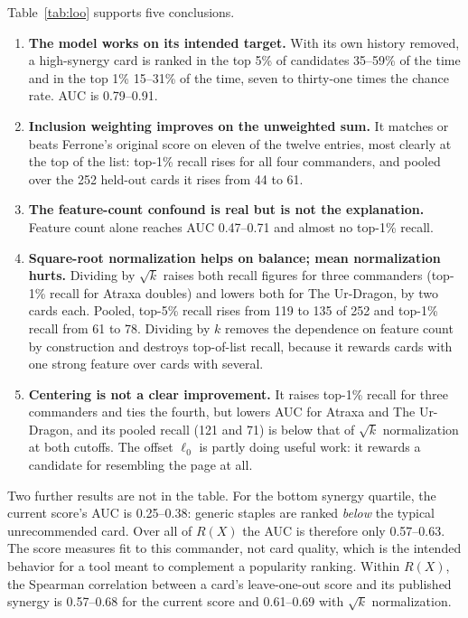 \documentclass[11pt]{article}
\theoremstyle{remark}
\begin{document}
\noindent Table~\ref{tab:loo} supports five conclusions.
\begin{enumerate}
  \item \textbf{The model works on its intended target.} With its own history
        removed, a high-synergy card is ranked in the top 5\% of candidates
        35--59\% of the time and in the top 1\% 15--31\% of the time, seven to
        thirty-one times the chance rate. AUC is 0.79--0.91.
  \item \textbf{Inclusion weighting improves on the unweighted sum.} It matches
        or beats Ferrone's original score on eleven of the twelve entries, most
        clearly at the top of the list: top-1\% recall rises for all four
        commanders, and pooled over the 252 held-out cards it rises from 44 to 61.
  \item \textbf{The feature-count confound is real but is not the explanation.}
        Feature count alone reaches AUC 0.47--0.71 and almost no top-1\% recall.
  \item \textbf{Square-root normalization helps on balance; mean normalization
        hurts.} Dividing by $\sqrt{k}$ raises both recall figures for three
        commanders (top-1\% recall for Atraxa doubles) and lowers both for The
        Ur-Dragon, by two cards each. Pooled, top-5\% recall rises from 119 to
        135 of 252 and top-1\% recall from 61 to 78. Dividing by $k$ removes the
        dependence on feature count by construction and destroys top-of-list
        recall, because it rewards cards with one strong feature over cards with
        several.
  \item \textbf{Centering is not a clear improvement.} It raises top-1\% recall
        for three commanders and ties the fourth, but lowers AUC for Atraxa and
        The Ur-Dragon, and its pooled recall (121 and 71) is below that of
        $\sqrt{k}$ normalization at both cutoffs. The offset $\ell_0$ is partly
        doing useful work: it rewards a candidate for resembling the page at
        all.
\end{enumerate}

Two further results are not in the table. For the bottom synergy quartile, the
current score's AUC is 0.25--0.38: generic staples are ranked \emph{below} the
typical unrecommended card. Over all of $R(X)$ the AUC is therefore only
0.57--0.63. The score measures fit to this commander, not card quality, which is
the intended behavior for a tool meant to complement a popularity ranking.
Within $R(X)$, the Spearman correlation between a card's leave-one-out score and
its published synergy is 0.57--0.68 for the current score and 0.61--0.69 with
$\sqrt{k}$ normalization.
\end{document}
